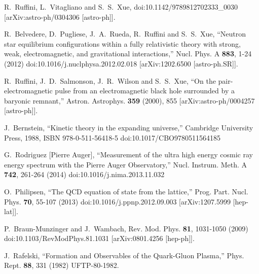\documentclass[universe,article,submit,moreauthors,pdftex,a4paper]{Definitions/mdpi}
\begin{document}
\begin{thebibliography}{99}
R.~Ruffini, L.~Vitagliano and S.~S.~Xue,
doi:10.1142/9789812702333\_0030
[arXiv:astro-ph/0304306 [astro-ph]].

R.~Belvedere, D.~Pugliese, J.~A.~Rueda, R.~Ruffini and S.~S.~Xue,
``Neutron star equilibrium configurations within a fully relativistic theory with strong, weak, electromagnetic, and gravitational interactions,''
Nucl. Phys. A \textbf{883}, 1-24 (2012)
doi:10.1016/j.nuclphysa.2012.02.018
[arXiv:1202.6500 [astro-ph.SR]].

R.~Ruffini, J.~D.~Salmonson, J.~R.~Wilson and S.~S.~Xue,
``On the pair-electromagnetic pulse from an electromagnetic black hole surrounded by a baryonic
remnant,''
Astron. Astrophys. \textbf{359} (2000), 855
[arXiv:astro-ph/0004257 [astro-ph]].

J.~Bernstein,
``Kinetic theory in the expanding universe,''
Cambridge University Press, 1988,
ISBN 978-0-511-56418-5
doi:10.1017/CBO9780511564185

G.~Rodriguez [Pierre Auger],
``Measurement of the ultra high energy cosmic ray energy spectrum with the Pierre Auger Observatory,''
Nucl. Instrum. Meth. A \textbf{742}, 261-264 (2014)
doi:10.1016/j.nima.2013.11.032

O.~Philipsen,
``The QCD equation of state from the lattice,''
Prog. Part. Nucl. Phys. \textbf{70}, 55-107 (2013)
doi:10.1016/j.ppnp.2012.09.003
[arXiv:1207.5999 [hep-lat]].

P.~Braun-Munzinger and J.~Wambach,
Rev. Mod. Phys. \textbf{81}, 1031-1050 (2009)
doi:10.1103/RevModPhys.81.1031
[arXiv:0801.4256 [hep-ph]].

J.~Rafelski,
``Formation and Observables of the Quark-Gluon Plasma,''
Phys. Rept. \textbf{88}, 331 (1982)
UFTP-80-1982.


\end{thebibliography}
\end{document}
